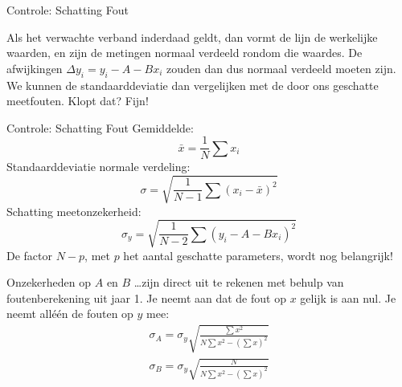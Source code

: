\documentclass{beamer}
\newcommand{\tsum}{\textstyle\sum}
\begin{document}
\begin{frame}{Controle: Schatting Fout}
  \begin{center}
  \end{center}
  Als het verwachte verband inderdaad geldt, dan vormt de lijn de \alert{werkelijke waarden}, en zijn de metingen normaal verdeeld rondom die waardes. De afwijkingen $\Delta y_i = y_i - A - Bx_i$ zouden dan dus normaal verdeeld moeten zijn. We kunnen de standaarddeviatie dan vergelijken met de door ons geschatte meetfouten. Klopt dat? Fijn!
\end{frame}

\begin{frame}{Controle: Schatting Fout}
  Gemiddelde:
  \begin{equation*}
    \bar x = \frac{1}{N}\sum x_i  \tag{0 parameters}
  \end{equation*}
  Standaarddeviatie normale verdeling:
  \begin{equation*}
    \sigma = \sqrt{\frac{1}{N-1}\sum(x_i - \bar x)^2} \tag{1 parameter}
  \end{equation*}
  Schatting meetonzekerheid:
  \begin{equation*}
    \sigma_y = \sqrt{\frac{1}{N-2}\sum(y_i - A - Bx_i)^2} \tag{2 parameters}
  \end{equation*}
  \pause
  De factor $N - p$, met $p$ het aantal geschatte parameters, wordt nog belangrijk!
\end{frame}

\begin{frame}{Onzekerheden op $A$ en $B$}
  \dots zijn direct uit te rekenen met behulp van foutenberekening uit jaar 1. Je neemt aan dat de fout op $x$ gelijk is aan nul. Je neemt alléén de fouten op $y$ mee:
  \begin{gather*}
    \sigma_A = \sigma_y\sqrt{\frac{\tsum x^2}{N\tsum x^2 - (\tsum x)^2}} \\[1em]
    \sigma_B = \sigma_y\sqrt{\frac{N}{N\tsum x^2 - (\tsum x)^2}}
  \end{gather*}
\end{frame}
\end{document}
